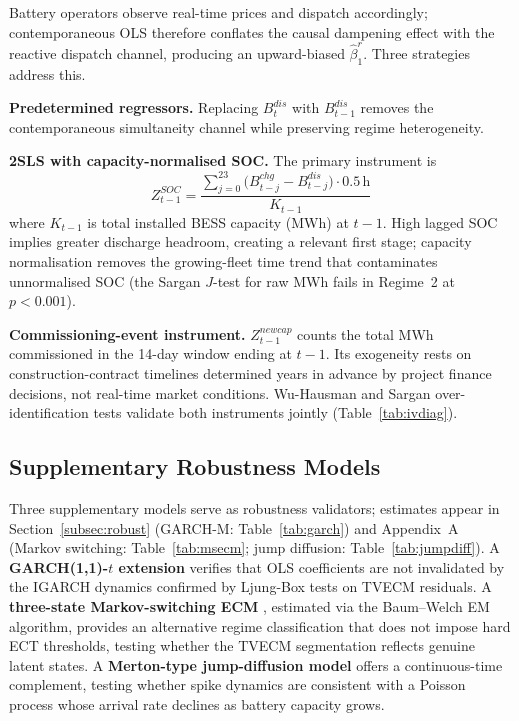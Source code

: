 \documentclass[12pt,a4paper]{article}
\begin{document}
Battery operators observe real-time prices and dispatch accordingly; contemporaneous
OLS therefore conflates the causal dampening effect with the reactive dispatch
channel, producing an upward-biased $\hat\beta_1^r$.  Three strategies address this.

\textbf{Predetermined regressors.}  Replacing $B_t^{dis}$ with $B_{t-1}^{dis}$
removes the contemporaneous simultaneity channel while preserving regime
heterogeneity.

\textbf{2SLS with capacity-normalised SOC.}  The primary instrument is
\begin{equation}
  \label{eq:soc}
  Z^{SOC}_{t-1} = \frac{\displaystyle\sum_{j=0}^{23}
    \bigl(B_{t-j}^{chg} - B_{t-j}^{dis}\bigr)\cdot 0.5\,\text{h}}{K_{t-1}}
\end{equation}
where $K_{t-1}$ is total installed BESS capacity (MWh) at $t-1$.  High lagged
SOC implies greater discharge headroom, creating a relevant first stage;
capacity normalisation removes the growing-fleet time trend that contaminates
unnormalised SOC (the Sargan $J$-test for raw MWh fails in Regime~2 at
$p < 0.001$).

\textbf{Commissioning-event instrument.}  $Z^{newcap}_{t-1}$ counts the total
MWh commissioned in the 14-day window ending at $t-1$.  Its exogeneity rests
on construction-contract timelines determined years in advance by project
finance decisions, not real-time market conditions.  Wu-Hausman and Sargan
over-identification tests \parencite{hausman1978specification,sargan1958estimation}
validate both instruments jointly (Table~\ref{tab:ivdiag}).

\subsection{Supplementary Robustness Models}
\label{subsec:supp}

Three supplementary models serve as robustness validators; estimates appear in
Section~\ref{subsec:robust} (GARCH-M: Table~\ref{tab:garch}) and
Appendix~A (Markov switching: Table~\ref{tab:msecm}; jump diffusion:
Table~\ref{tab:jumpdiff}).  A \textbf{GARCH(1,1)-$t$ extension}
\parencite{engle1982autoregressive,bollerslev1986generalized} verifies that OLS
coefficients are not invalidated by the IGARCH dynamics confirmed by Ljung-Box
tests on TVECM residuals.  A \textbf{three-state Markov-switching ECM}
\parencite{hamilton1989new}, estimated via the Baum--Welch EM algorithm,
provides an alternative regime classification that does not impose hard ECT
thresholds, testing whether the TVECM segmentation reflects genuine latent
states.  A \textbf{Merton-type jump-diffusion model} offers a continuous-time
complement, testing whether spike dynamics are consistent with a Poisson process
whose arrival rate declines as battery capacity grows.
\end{document}
